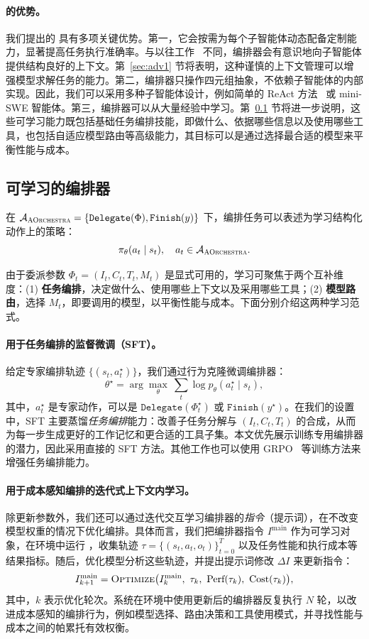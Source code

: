 \paragraph{\our{} 的优势。}
我们提出的 \our{} 具有多项关键优势。第一，它会按需为每个子智能体动态配备定制能力，显著提高任务执行准确率。与以往工作~\cite{sun2025scaling, anthropic_claude_code_subagents} 不同，编排器会有意识地向子智能体提供结构良好的上下文。第~\ref{sec:adv1} 节将表明，这种谨慎的上下文管理可以增强模型求解任务的能力。第二，编排器只操作四元组抽象，不依赖子智能体的内部实现。因此，我们可以采用多种子智能体设计，例如简单的 ReAct 方法~\cite{yao2022react} 或 mini-SWE 智能体。第三，编排器可以从大量经验中学习。第~\ref{sec:learnable} 节将进一步说明，这些可学习能力既包括基础任务编排技能，即做什么、依据哪些信息以及使用哪些工具，也包括自适应模型路由等高级能力，其目标可以是通过选择最合适的模型来平衡性能与成本。

\subsection{可学习的编排器}
\label{sec:learnable}

在 $\mathcal{A}_{\textsc{AOrchestra}}=\{\texttt{Delegate}(\Phi),\texttt{Finish}(y)\}$ 下，编排任务可以表述为学习结构化动作上的策略：
\[
\pi_\theta(a_t \mid s_t),\quad a_t\in\mathcal{A}_{\textsc{AOrchestra}}.
\]

由于委派参数 $\Phi_t=(I_t,C_t,T_t,M_t)$ 是显式可用的，学习可聚焦于两个互补维度：(1) \textbf{任务编排}，决定做什么、使用哪些上下文以及采用哪些工具；(2) \textbf{模型路由}，选择 $M_t$，即要调用的模型，以平衡性能与成本。下面分别介绍这两种学习范式。

\paragraph{用于任务编排的监督微调（SFT）。}
给定专家编排轨迹 $\{(s_t,a_t^\star)\}$，我们通过行为克隆微调编排器：
\[
\theta^\star = \arg\max_{\theta}\ \sum_{t} \log p_{\theta}(a_t^\star \mid s_t),
\]
其中，$a_t^\star$ 是专家动作，可以是 $\texttt{Delegate}(\Phi_t^\star)$ 或 $\texttt{Finish}(y^\star)$。在我们的设置中，SFT 主要蒸馏\emph{任务编排}能力：改善子任务分解与 $(I_t,C_t,T_t)$ 的合成，从而为每一步生成更好的工作记忆和更合适的工具子集。本文优先展示训练专用编排器的潜力，因此采用直接的 SFT 方法。其他工作也可以使用 GRPO~\cite{shao2024deepseekmath} 等训练方法来增强任务编排能力。

\paragraph{用于成本感知编排的迭代式上下文内学习。}
除更新参数外，我们还可以通过迭代交互学习编排器的\emph{指令}（提示词），在不改变模型权重的情况下优化编排。具体而言，我们把编排器指令 $I^{\text{main}}$ 作为可学习对象，在环境中运行 \our{}，收集轨迹 $\tau=\{(s_t,a_t,o_t)\}_{t=0}^{T}$ 以及任务性能和执行成本等结果指标。随后，优化模型分析这些轨迹，并提出提示词修改 $\Delta I$ 来更新指令：
\[
I^{\text{main}}_{k+1} = \textsc{Optimize}\bigl(I^{\text{main}}_{k},\ \tau_k,\ \text{Perf}(\tau_k),\ \text{Cost}(\tau_k)\bigr),
\]
其中，$k$ 表示优化轮次。系统在环境中使用更新后的编排器反复执行 $N$ 轮，以改进成本感知的编排行为，例如模型选择、路由决策和工具使用模式，并寻找性能与成本之间的帕累托有效权衡。
